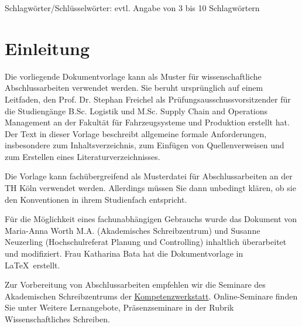 \documentclass[a4paper,11pt]{article}%
\renewcommand{\\}{\vspace*{0.5\baselineskip} \newline}
\begin{document}
Schlagwörter/Schlüsselwörter: evtl. Angabe von 3 bis 10 Schlagwörtern 

\newpage

\tableofcontents

\newpage

\listoftables{}

\newpage

\listoffigures{}

\newpage


\section*{Einleitung}

Die vorliegende Dokumentvorlage kann als Muster für wissenschaftliche Abschlussarbeiten verwendet werden. Sie beruht ursprünglich auf einem Leitfaden, den Prof. Dr. Stephan Freichel als Prüfungsausschussvorsitzender für die Studiengänge B.Sc. Logistik und M.Sc. Supply Chain and Operations Management an der Fakultät für Fahrzeugsysteme und Produktion erstellt hat.\\ Der Text in dieser Vorlage beschreibt allgemeine formale Anforderungen, insbesondere zum Inhaltsverzeichnis, zum Einfügen von Quellenverweisen und zum Erstellen eines Literaturverzeichnisses.\\

Die Vorlage kann fachübergreifend als Musterdatei für Abschlussarbeiten an der TH Köln verwendet werden. Allerdings müssen Sie dann unbedingt klären, ob sie den Konventionen in ihrem Studienfach entspricht.\\

Für die Möglichkeit eines fachunabhängigen Gebrauchs wurde das Dokument von Maria-Anna Worth M.A. (Akademisches Schreibzentrum) und Susanne Neuzerling (Hochschulreferat Planung und Controlling) inhaltlich überarbeitet und modifiziert. Frau Katharina Bata hat die Dokumentvorlage in \LaTeX~erstellt.\\

Zur Vorbereitung von Abschlussarbeiten empfehlen wir die Seminare des Akademischen Schreibzentrums der \href{https://www.th-koeln.de/studium/schluesselkompetenzen_25490.php}{\underline{Kompetenzwerkstatt}}. Online-Seminare finden Sie unter Weitere Lernangebote, Präsenzseminare in der Rubrik Wissenschaftliches Schreiben.\\
\end{document}
